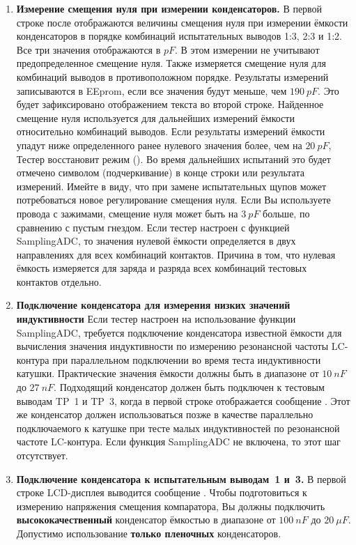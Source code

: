 \begin{enumerate}
\item \textbf{ Измерение смещения нуля при измерении конденсаторов.}
В первой строке после  отображаются величины смещения нуля при измерении ёмкости конденсаторов в порядке 
комбинаций испытательных выводов 1:3, 2:3 и 1:2. Все три значения отображаются в \(pF\). В этом измерении не 
учитывают предопределенное смещение нуля. Также измеряется смещение нуля для комбинаций выводов в противоположном 
порядке. Результаты измерений записываются в EEprom, если все значения будут меньше, чем \(190~pF\). Это будет 
зафиксировано отображением текста  во второй  строке. Найденное смещение нуля используется для дальнейших 
измерений ёмкости относительно комбинаций выводов. Если результаты измерений ёмкости упадут ниже определенного 
ранее нулевого значения более, чем на \(20~pF\), Тестер восстановит режим  (). 
Во время дальнейших испытаний это будет отмечено символом \inquotes{\_} (подчеркивание) в конце строки или результата измерений. Имейте в 
виду, что при замене испытательных щупов может потребоваться новое регулирование смещения нуля. Если Вы 
используете провода с зажимами, смещение нуля может быть на \(3~pF\) больше, по сравнению с пустым гнездом.
Если тестер настроен с функцией SamplingADC, то значения нулевой ёмкости определяется в двух направлениях для
всех комбинаций контактов. Причина в том, что нулевая ёмкость измеряется для заряда и разряда всех комбинаций
тестовых контактов отдельно.

\item \textbf{ Подключение конденсатора для измерения низких значений индуктивности}
Если тестер настроен на использование функции SamplingADC, требуется подключение конденсатора известной ёмкости
для вычисления значения индуктивности по измерению резонансной частоты LC-контура при параллельном подключении
во время теста индуктивности катушки.
Практические значения ёмкости должны быть в диапазоне от \(10~nF\) до \(27~nF\).
Подходящий конденсатор должен быть подключен к тестовым выводам TP~1 и TP~3, когда в первой строке отображается
сообщение .
Этот же конденсатор должен использоваться позже в качестве параллельно подключаемого к катушке при тесте малых 
индуктивностей по резонансной частоте LC-контура.
Если функция SamplingADC не включена, то этот шаг отсутствует.

\item \textbf{ Подключение конденсатора к испытательным выводам~1 и~3.}
В первой строке LCD-дисплея выводится сообщение . Чтобы подготовиться 
к измерению напряжения смещения компаратора, Вы должны подключить \textbf{ высококачественный} 
конденсатор ёмкостью в диапазоне от  \(100~nF\) до \(20~\mu F\).
Допустимо использование \textbf{ только пленочных} конденсаторов.


\end{enumerate}
